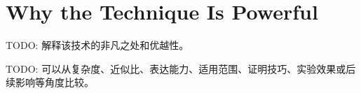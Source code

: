 \section{Why the Technique Is Powerful}

TODO: 解释该技术的非凡之处和优越性。

TODO: 可以从复杂度、近似比、表达能力、适用范围、证明技巧、实验效果或后续影响等角度比较。

